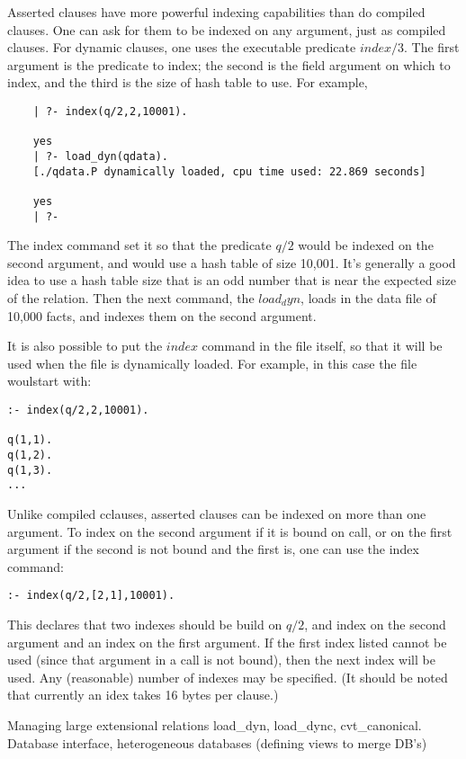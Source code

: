Asserted clauses have more powerful indexing capabilities than do
compiled clauses.  One can ask for them to be indexed on any argument,
just as compiled clauses.  For dynamic clauses, one uses the
executable predicate $index/3$.  The first argument is the predicate
to index; the second is the field argument on which to index, and the
third is the size of hash table to use.  For example,
\begin{verbatim}
	| ?- index(q/2,2,10001).

	yes
	| ?- load_dyn(qdata).
	[./qdata.P dynamically loaded, cpu time used: 22.869 seconds]

	yes
	| ?- 
\end{verbatim}
The index command set it so that the predicate $q/2$ would be indexed
on the second argument, and would use a hash table of size 10,001.
It's generally a good idea to use a hash table size that is an odd
number that is near the expected size of the relation.  Then the next
command, the $load_dyn$, loads in the data file of 10,000 facts, and
indexes them on the second argument.

It is also possible to put the $index$ command in the file itself, so
that it will be used when the file is dynamically loaded.  For
example, in this case the  file woulstart with:
\begin{verbatim}
:- index(q/2,2,10001).

q(1,1).
q(1,2).
q(1,3).
...
\end{verbatim}

Unlike compiled cclauses, asserted clauses can be indexed on more than
one argument.  To index on the second argument if it is bound on
call, or on the first argument if the second is not bound and the
first is, one can use the index command:
\begin{verbatim}
:- index(q/2,[2,1],10001).
\end{verbatim}
This declares that two indexes should be build on $q/2$, and index on
the second argument and an index on the first argument.  If the first
index listed cannot be used (since that argument in a call is not
bound), then the next index will be used.  Any (reasonable) number of
indexes may be specified.  (It should be noted that currently an idex
takes 16 bytes per clause.)





Managing large extensional relations
  load\_dyn, load\_dync, cvt\_canonical.
  Database interface, heterogeneous databases
  (defining views to merge DB's)



